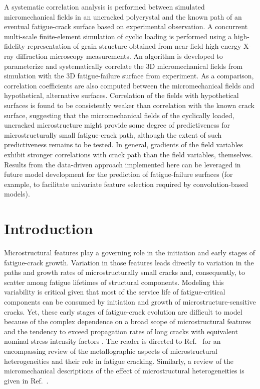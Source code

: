 A systematic correlation analysis is performed between simulated micromechanical fields in an uncracked polycrystal and the known path of an eventual fatigue-crack surface based on experimental observation. A concurrent multi-scale finite-element simulation of cyclic loading is performed using a high-fidelity representation of grain structure obtained from near-field high-energy X-ray diffraction microscopy measurements. An algorithm is developed to parameterize and systematically correlate the 3D micromechanical fields from simulation with the 3D fatigue-failure surface from experiment. As a comparison, correlation coefficients are also computed between the micromechanical fields and hypothetical, alternative surfaces. Correlation of the fields with hypothetical surfaces is found to be consistently weaker than correlation with the known crack surface, suggesting that the micromechanical fields of the cyclically loaded, uncracked microstructure might provide some degree of predictiveness for microstructurally small fatigue-crack path, although the extent of such predictiveness remains to be tested. In general, gradients of the field variables exhibit stronger correlations with crack path than the field variables, themselves. Results from the data-driven approach implemented here can be leveraged in future model development for the prediction of fatigue-failure surfaces (for example, to facilitate univariate feature selection required by convolution-based models).

\section{Introduction}
Microstructural features play a governing role in the initiation and early stages of fatigue-crack growth. Variation in those features leads directly to variation in the paths and growth rates of microstructurally small cracks and, consequently, to scatter among fatigue lifetimes of structural components. Modeling this variability is critical given that most of the service life of fatigue-critical components can be consumed by initiation and growth of microstructure-sensitive cracks. Yet, these early stages of fatigue-crack evolution are difficult to model because of the complex dependence on a broad scope of microstructural features and the tendency to exceed propagation rates of long cracks with equivalent nominal stress intensity factors \cite{Ritchie_1986}. The reader is directed to Ref.~\cite{Murty_2017} for an encompassing review of the metallographic aspects of microstructural heterogeneities and their role in fatigue cracking. Similarly, a review of the micromechanical descriptions of the effect of microstructural heterogeneities is given in Ref.~\cite{Mughrabi_2014}.

